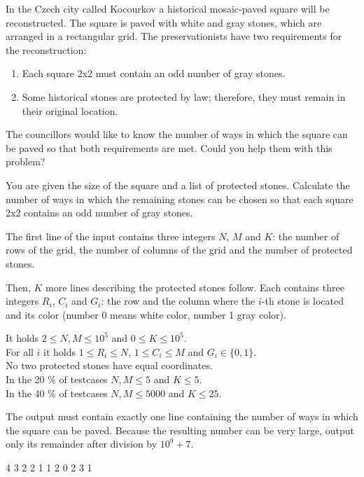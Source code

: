 





In the Czech city called Kocourkov a historical mosaic-paved square will be
reconstructed. The square is paved with white and gray stones, which are
arranged in a rectangular grid. The preservationists have two requirements for
the reconstruction:

\begin{enumerate}[nolistsep]
\item Each square 2x2 must contain an odd number of gray stones.
\item Some historical stones are protected by law; therefore, they must remain
  in their original location.
\end{enumerate}

The councillors would like to know the number of ways in which the square can be
paved so that both requirements are met. Could you help them with this problem?


You are given the size of the square and a list of protected stones. Calculate
the number of ways in which the remaining stones can be chosen so that each
square 2x2 contains an odd number of gray stones.


The first line of the input contains three integers $N$, $M$ and $K$: the number
of rows of the grid, the number of columns of the grid and the number of
protected stones.

Then, $K$ more lines describing the protected stones follow. Each contains three
integers $R_i$, $C_i$ and $G_i$: the row and the column where the $i$-th stone
is located and its color (number 0 means white color, number 1 gray color).

\bigskip
\noindent
It holds $2 \leq N,M \leq 10^5$ and $0 \leq K \leq 10^5$.\\
For all $i$ it holds $1 \leq R_i \leq N$, $1 \leq C_i \leq M$ and
  $G_i \in \{ 0, 1 \}$.\\
No two protected stones have equal coordinates.\\
In the 20 \% of testcases $N,M \leq 5$ and $K \leq 5$.\\
In the 40 \% of testcases $N,M \leq 5000$ and $K \leq 25$.


The output must contain exactly one line containing the number of ways in which
the square can be paved. Because the resulting number can be very large, output
only its remainder after division by $10^9 + 7$.


 4 3
2 2 1
1 2 0
2 3 1
\sampleEND


